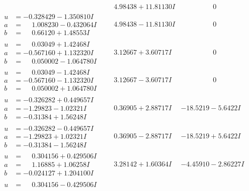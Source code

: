\documentclass[1p]{elsarticle_modified}
\theoremstyle{definition}
\begin{document}
$$\begin{array}{c|c|c}
 & \phantom{-}4.98438 + 11.81130 I & \phantom{-0.000000 } 0 \\ \hline\begin{aligned}
u &= -0.328429 - 1.350810 I \\
a &= \phantom{-}1.008230 - 0.432064 I \\
b &= \phantom{-}0.66120 + 1.48553 I\end{aligned}
 & \phantom{-}4.98438 - 11.81130 I & \phantom{-0.000000 } 0 \\ \hline\begin{aligned}
u &= \phantom{-}0.03049 + 1.42468 I \\
a &= -0.567160 + 1.132320 I \\
b &= \phantom{-}0.050002 - 1.064780 I\end{aligned}
 & \phantom{-}3.12667 + 3.60717 I & \phantom{-0.000000 } 0 \\ \hline\begin{aligned}
u &= \phantom{-}0.03049 - 1.42468 I \\
a &= -0.567160 - 1.132320 I \\
b &= \phantom{-}0.050002 + 1.064780 I\end{aligned}
 & \phantom{-}3.12667 - 3.60717 I & \phantom{-0.000000 } 0 \\ \hline\begin{aligned}
u &= -0.326282 + 0.449657 I \\
a &= -1.29823 - 1.02321 I \\
b &= -0.31384 + 1.56248 I\end{aligned}
 & \phantom{-}0.36905 + 2.88717 I & -18.5219 - 5.6422 I \\ \hline\begin{aligned}
u &= -0.326282 - 0.449657 I \\
a &= -1.29823 + 1.02321 I \\
b &= -0.31384 - 1.56248 I\end{aligned}
 & \phantom{-}0.36905 - 2.88717 I & -18.5219 + 5.6422 I \\ \hline\begin{aligned}
u &= \phantom{-}0.304156 + 0.429506 I \\
a &= \phantom{-}1.16885 + 1.06258 I \\
b &= -0.024127 + 1.204100 I\end{aligned}
 & \phantom{-}3.28142 + 1.60364 I & -4.45910 - 2.86227 I \\ \hline\begin{aligned}
u &= \phantom{-}0.304156 - 0.429506 I \\

\end{aligned}
\end{array}$$
\end{document}

